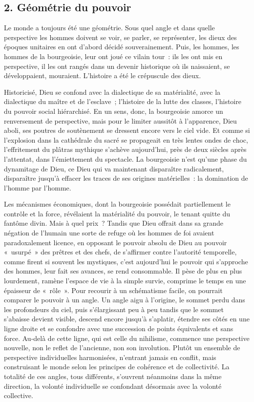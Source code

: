 \documentclass[french,twoside]{book} %
\begin{document}
\subsection[{2. Géométrie du pouvoir}]{\textsc{2.} Géométrie du pouvoir}
\noindent Le monde a toujours été une géométrie. Sous quel angle et dans quelle perspective les hommes doivent se voir, se parler, se représenter, les dieux des époques unitaires en ont d’abord décidé souverainement. Puis, les hommes, les hommes de la bourgeoisie, leur ont joué ce vilain tour : ils les ont mis en perspective, il les ont rangés dans un devenir historique où ils naissaient, se développaient, mouraient. L’histoire a été le crépuscule des dieux.\par
Historicisé, Dieu se confond avec la dialectique de sa matérialité, avec la dialectique du maître et de l’esclave ; l’histoire de la lutte des classes, l’histoire du pouvoir social hiérarchisé. En un sens, donc, la bourgeoisie amorce un renversement de perspective, mais pour le limiter aussitôt à l’apparence, Dieu aboli, ses poutres de soutènement se dressent encore vers le ciel vide. Et comme si l’explosion dans la cathédrale du sacré se propageait en très lentes ondes de choc, l’effritement du plâtras mythique s’achève aujourd’hui, près de deux siècles après l’attentat, dans l’émiettement du spectacle. La bourgeoisie n’est qu’une phase du dynamitage de Dieu, ce Dieu qui va maintenant disparaître radicalement, disparaître jusqu’à effacer les traces de ses origines matérielles : la domination de l’homme par l’homme.\par
Les mécanismes économiques, dont la bourgeoisie possédait partiellement le contrôle et la force, révélaient la matérialité du pouvoir, le tenant quitte du fantôme divin. Mais à quel prix ? Tandis que Dieu offrait dans sa grande négation de l’humain une sorte de refuge où les hommes de foi avaient paradoxalement licence, en opposant le pouvoir absolu de Dieu au pouvoir « usurpé » des prêtres et des chefs, de s’affirmer contre l’autorité temporelle, comme firent si souvent les mystiques, c’est aujourd’hui le pouvoir qui s’approche des hommes, leur fait ses avances, se rend consommable. Il pèse de plus en plus lourdement, ramène l’espace de vie à la simple survie, comprime le temps en une épaisseur de « rôle ». Pour recourir à un schématisme facile, on pourrait comparer le pouvoir à un angle. Un angle aigu à l’origine, le sommet perdu dans les profondeurs du ciel, puis s’élargissant peu à peu tandis que le sommet s’abaisse devient visible, descend encore jusqu’à s’aplatir, étendre ses côtés en une ligne droite et se confondre avec une succession de points équivalents et sans force. Au-delà de cette ligne, qui est celle du nihilisme, commence une perspective nouvelle, non le reflet de l’ancienne, non son involution. Plutôt un ensemble de perspective individuelles harmonisées, n’entrant jamais en conflit, mais construisant le monde selon les principes de cohérence et de collectivité. La totalité de ces angles, tous différents, s’ouvrent néanmoins dans la même direction, la volonté individuelle se confondant désormais avec la volonté collective.\par
\end{document}
